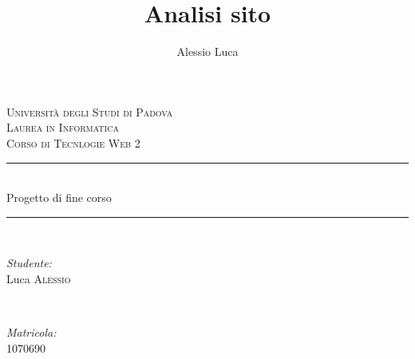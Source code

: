 \documentclass[12pt]{article}
\title{Analisi sito}
\date{}
\author{Alessio Luca}
\begin{document}



\begin{titlepage}

\newcommand{\HRule}{\rule{\linewidth}{0.5mm}} %

\center %
 

\textsc{\LARGE Universit\`a degli Studi di Padova}\\[1.5cm] %
\textsc{\Large Laurea in Informatica}\\[0.5cm] %
\textsc{\large Corso di Tecnlogie Web 2}\\[0.5cm] %


\HRule \\[0.4cm]
{ \huge  Progetto di fine corso}\\[0.3cm] %
\HRule \\[1.5cm]
 

\begin{minipage}{0.4\textwidth}
\begin{flushleft} \large
\emph{Studente:}\\
Luca \textsc{Alessio} %
\end{flushleft}
\end{minipage}
~
\begin{minipage}{0.4\textwidth}
\begin{flushright} \large
\emph{Matricola:} \\
\textsc{1070690} %
\end{flushright}
\end{minipage}\\[4cm]


\end{titlepage}
\end{document}
